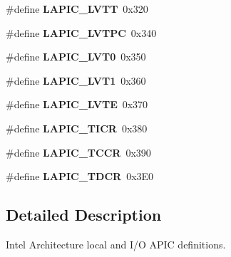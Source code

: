 \begin{DoxyCompactItemize}
\#define {\bfseries L\+A\+P\+I\+C\+\_\+\+L\+V\+TT}~0x320
\item 
\mbox{\label{group__i386__apci_ga31fb5a384d98252d0d176ba9d7ef468e}} 
\#define {\bfseries L\+A\+P\+I\+C\+\_\+\+L\+V\+T\+PC}~0x340
\item 
\mbox{\label{group__i386__apci_gaa162c3273fef488bb512f5dd5aa0017d}} 
\#define {\bfseries L\+A\+P\+I\+C\+\_\+\+L\+V\+T0}~0x350
\item 
\mbox{\label{group__i386__apci_ga340b3684f8b604b146d3364cc429586c}} 
\#define {\bfseries L\+A\+P\+I\+C\+\_\+\+L\+V\+T1}~0x360
\item 
\mbox{\label{group__i386__apci_gac369f0ee8bc3ee5670bd7290f0b4869b}} 
\#define {\bfseries L\+A\+P\+I\+C\+\_\+\+L\+V\+TE}~0x370
\item 
\mbox{\label{group__i386__apci_gae6bd12c91d0d007a46571f531f1b8ca9}} 
\#define {\bfseries L\+A\+P\+I\+C\+\_\+\+T\+I\+CR}~0x380
\item 
\mbox{\label{group__i386__apci_gac54eaf83afe0503ef679786894be9e7c}} 
\#define {\bfseries L\+A\+P\+I\+C\+\_\+\+T\+C\+CR}~0x390
\item 
\mbox{\label{group__i386__apci_ga30d4359c1f2ed0533a11d010848382f1}} 
\#define {\bfseries L\+A\+P\+I\+C\+\_\+\+T\+D\+CR}~0x3\+E0
\end{DoxyCompactItemize}


\subsection{Detailed Description}
Intel Architecture local and I/O A\+P\+IC definitions. 

